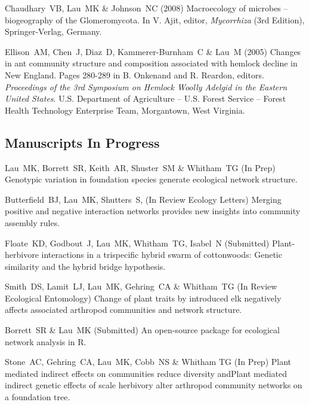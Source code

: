 \documentclass[letterpaper]{article}
\renewenvironment{itemize}{
  \begin{list}{}{
    \setlength{\leftmargin}{1em}
  }
}{
  \end{list}
}
\begin{document}
\begin{itemize}
\item Chaudhary\ VB, Lau\ MK \& Johnson\ NC (2008) Macroecology of
  microbes -- biogeography of the Glomeromycota. In V. Ajit, editor,
  \textit{Mycorrhiza} (3rd Edition), Springer-Verlag, Germany.

\item Ellison\ AM, Chen\ J, Diaz\ D, Kammerer-Burnham\ C \& Lau\ M
  (2005) Changes in ant community structure and composition associated
  with hemlock decline in New England. Pages 280-289 in B. Onkenand
  and R. Reardon, editors. \textit{Proceedings of the 3rd Symposium on
    Hemlock Woolly Adelgid in the Eastern United
    States}. U.S. Department of Agriculture -- U.S. Forest Service --
  Forest Health Technology Enterprise Team, Morgantown, West
  Virginia. 

\subsection*{Manuscripts In Progress}

\begin{itemize}

\item Lau\ MK, Borrett\ SR, Keith\ AR, Shuster\ SM \& Whitham\ TG (In
  Prep) Genotypic variation in foundation species generate ecological
  network structure. 

\item Butterfield\ BJ, Lau\ MK, Shutters\ S, (In Review Ecology
  Letters) Merging positive and negative interaction networks provides
  new insights into community assembly rules.

\item Floate\ KD, Godbout\ J, Lau\ MK, Whitham\ TG, Isabel\ N
  (Submitted) Plant-herbivore interactions in a trispecific hybrid swarm of
  cottonwoods:  Genetic similarity and the hybrid bridge hypothesis.

\item Smith\ DS, Lamit\ LJ, Lau\ MK, Gehring\ CA \& Whitham\ TG
  (In Review Ecological Entomology) Change of plant traits by
  introduced elk negatively affects associated arthropod communities
  and network structure.

\item Borrett\ SR \& Lau\ MK (Submitted) An open-source package for
  ecological network analysis in R.

\item Stone\ AC, Gehring\ CA, Lau\ MK, Cobb\ NS \& Whitham TG
  (In Prep) Plant mediated indirect effects on communities reduce
  diversity andPlant mediated indirect genetic effects of scale
  herbivory alter arthropod community networks on a foundation tree.

\end{itemize}

\end{itemize}
\end{document}

